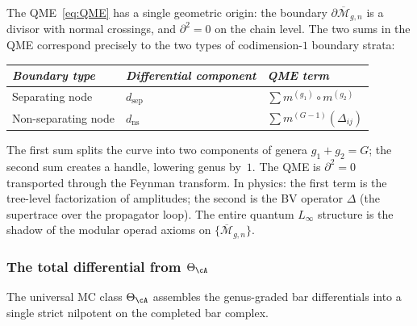\begin{remark}[The QME as $\partial^2 = 0$ on moduli]
\label{rem:qme-boundary-squared}
The QME~\eqref{eq:QME} has a single geometric origin: the boundary
$\partial\overline{\mathcal{M}}_{g,n}$ is a divisor with normal
crossings, and $\partial^2 = 0$ on the chain level.  The two sums
in the QME correspond precisely to the two types of codimension-$1$
boundary strata:

\smallskip
\begin{center}
\renewcommand{\arraystretch}{1.3}
\begin{tabular}{lll}
\toprule
\emph{Boundary type} & \emph{Differential component}
  & \emph{QME term} \\
\midrule
Separating node & $d_{\mathrm{sep}}$
  & $\sum m^{(g_1)} \circ m^{(g_2)}$ \\
Non-separating node & $d_{\mathrm{ns}}$
  & $\sum m^{(G-1)}(\Delta_{ij})$ \\
\bottomrule
\end{tabular}
\end{center}
\smallskip

\noindent
The first sum splits the curve into two components of genera
$g_1 + g_2 = G$; the second sum creates a handle, lowering genus by~$1$.
The QME is $\partial^2 = 0$ transported through the Feynman transform.
In physics: the first term is the tree-level factorization of
amplitudes; the second is the BV operator $\Delta$ (the supertrace
over the propagator loop).  The entire quantum $L_\infty$ structure
is the shadow of the modular operad axioms on
$\{\overline{\mathcal{M}}_{g,n}\}$.
\end{remark}

\subsubsection{The total differential from
\texorpdfstring{$\Theta_\cA$}{Theta-A}}
\label{subsubsec:total-differential-from-theta}

The universal MC class $\Theta_\cA$ assembles the genus-graded bar
differentials into a single strict nilpotent on the completed bar
complex.

